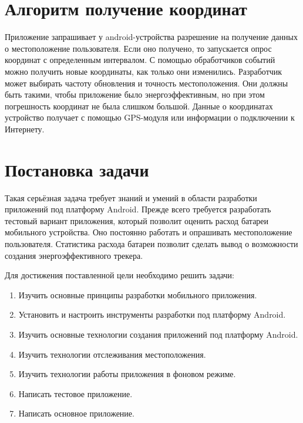 \documentclass[a4paper,12pt]{article}
\begin{document}
\pagebreak

\section{Алгоритм получение координат}
Приложение запрашивает у android-устройства разрешение на получение
данных о местоположение пользователя. Если оно получено, то
запускается опрос координат с определенным интервалом. С помощью
обработчиков событий можно получить новые координаты, как только они
изменились. Разработчик может выбирать частоту обновления и точность 
местоположения. Они должны быть такими, чтобы приложение было 
энергоэффективным, но при этом погрешность координат не была 
слишком большой. Данные о координатах устройство получает с помощью
GPS-модуля или информации о подключении к Интернету\cite{documentation}.

\pagebreak


\section{Постановка задачи}

Такая серьёзная задача требует знаний и умений в области
разработки приложений под платформу Android. Прежде всего
требуется разработать тестовый вариант приложения, который
позволит оценить расход батареи мобильного устройства. Оно
постоянно работать и опрашивать местоположение пользователя.
Статистика расхода батареи позволит сделать вывод
о возможности создания энергоэффективного трекера.

Для достижения поставленной цели необходимо решить задачи:

\begin{enumerate}
\item Изучить основные принципы разработки мобильного приложения.
\item Установить и настроить инструменты разработки под платформу Android.
\item Изучить основные технологии создания приложений под платформу Android.
\item Изучить технологии отслеживания местоположения.
\item Изучить технологии работы приложения в фоновом режиме.
\item Написать тестовое приложение.
\item Написать основное приложение.
\end{enumerate}
\end{document}
